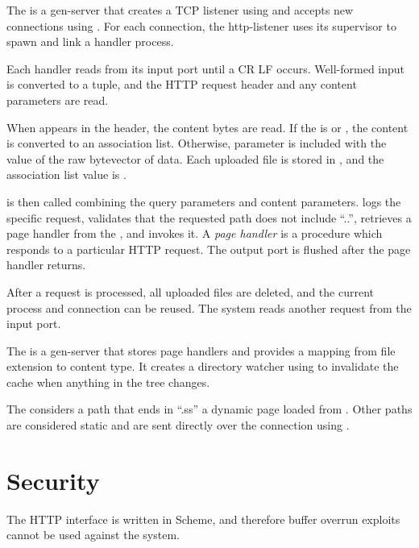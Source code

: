 The  is a gen-server that creates a TCP listener
using  and accepts new connections using
. For each connection, the http-listener uses its
supervisor to spawn and link a handler process.

Each handler reads from its input port until a CR LF
occurs. Well-formed input is converted to a  tuple,
and the HTTP request header and any content parameters are read.

When  appears in the header, the content bytes
are read. If the  is 
or , the content is
converted to an association list. Otherwise, parameter
 is included with the value of the raw
bytevector of data. Each uploaded file is stored in
, and the association list value is
.

 is then called combining the
 query parameters and content
parameters.  logs the specific request,
validates that the requested path does not include ``..'', retrieves a
page handler from the , and invokes it. A
\emph{page handler} is a procedure which responds to a particular HTTP
request. The output port is flushed after the page handler returns.

After a request is processed, all uploaded files are deleted, and the
current process and connection can be reused. The system reads another
request from the input port.

The  is a gen-server that stores page handlers and
provides a mapping from file extension to content type. It creates a
directory watcher using  to invalidate the
cache when anything in the  tree changes.

The  considers a path that ends in ``.ss'' a
dynamic page loaded from . Other paths are
considered static and are sent directly over the connection using
.

\section {Security}

The HTTP interface is written in Scheme, and therefore buffer overrun
exploits cannot be used against the system.

